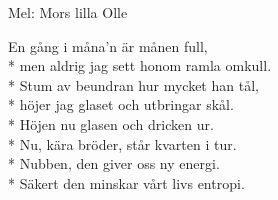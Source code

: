 \begin{SongText}
    \begin{SongInfo}
        Mel: Mors lilla Olle
    \end{SongInfo}
    \begin{SongVerse}
        En gång i måna’n är månen full,\\*%
        men aldrig jag sett honom ramla omkull.\\*%
        Stum av beundran hur mycket han tål,\\*%
        höjer jag glaset och utbringar skål.\\*%
        Höjen nu glasen och dricken ur.\\*%
        Nu, kära bröder, står kvarten i tur.\\*%
        Nubben, den giver oss ny energi.\\*%
        Säkert den minskar vårt livs entropi.
    \end{SongVerse}
\end{SongText}
